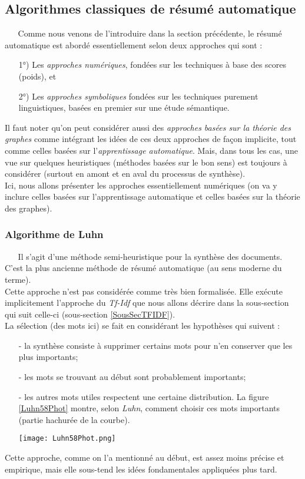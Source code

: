 \subsection{Algorithmes classiques de résumé automatique}
$ _{} $ $ _{} $ $ _{} $ $ _{} $ $ _{} $Comme nous venons de l'introduire dans la section précédente, le résumé automatique est abordé es\-sen\-tiel\-le\-ment selon deux approches qui sont \cite{maaloul:tel-00756111} :
\begin{itemize}
\item[1°)] Les \textit{approches numériques}, fondées sur les techniques à base des scores (poids), et
\item[2°)] Les \textit{approches symboliques} fondées sur les techniques purement linguistiques, basées en premier sur une étude sémantique.
\end{itemize}
Il faut noter qu'on peut considérer aussi des \textit{approches basées sur la théorie des graphes} comme intégrant les idées de ces deux approches de façon implicite, tout comme celles basées sur l'\textit{apprentissage automatique}. Mais, dans tous les cas, une vue sur quelques heuristiques (méthodes basées sur le bon sens) est toujours à considérer (surtout en amont et en aval du processus de synthèse).\\
Ici, nous allons présenter les approches essentiellement numériques (on va y inclure celles basées sur l'apprentissage automatique et celles basées sur la théorie des graphes).

\subsubsection{Algorithme de Luhn \cite{Luhn58}}
$ _{} $ $ _{} $ $ _{} $ $ _{} $ $ _{} $Il s'agit d'une méthode semi-heuristique pour la synthèse des documents. C'est la plus ancienne méthode de résumé automatique (au sens moderne du terme).\\
Cette approche n'est pas considérée comme très bien formalisée. Elle exécute impli\-ci\-te\-ment l'approche du \textit{Tf-Idf} que nous allons décrire dans la sous-section qui suit celle-ci (sous-section \ref{SousSecTFIDF}).\\
La sélection (des mots ici) se fait en considérant les hypothèses qui suivent :
\begin{itemize}
\item[-] la synthèse consiste à supprimer certains mots pour n'en conserver que les plus importants;
\item[-] les mots se trouvant au début sont probablement importants;
\item[-] les autres mots utiles respectent une certaine distribution. La figure \ref{Luhn58Phot} montre, selon \textit{Luhn}, comment choisir ces mots importants (partie hachurée de la courbe).\newpage
\begin{center}
\texttt{[image: Luhn58Phot.png]}
\label{Luhn58Phot}
\end{center}
\end{itemize}
Cette approche, comme on l'a mentionné au début, est assez moins précise et empirique, mais elle sous-tend les idées fondamentales appliquées plus tard.

